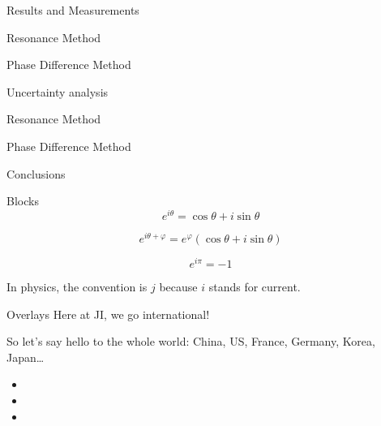 \documentclass{beamer}
\begin{document}
\begin{frame}{Results and Measurements}
\end{frame}
\begin{frame}{Resonance Method}
\end{frame}
\begin{frame}{Phase Difference Method}
\end{frame}

\begin{frame}{Uncertainty analysis}
\end{frame}
\begin{frame}{Resonance Method}
\end{frame}
\begin{frame}{Phase Difference Method}
\end{frame}

\begin{frame}{Conclusions}
\end{frame}

\begin{frame}{Blocks}
    \[
        e^{i \theta} = \cos \theta + i \sin \theta
    \]

    \[
        e^{i \theta + \varphi} = e^\varphi (\cos \theta + i \sin \theta)
    \]

    \[
        e^{i \pi} = -1
    \]

    In physics, the convention is $j$ because $i$ stands for current.
\end{frame}

\begin{frame}{Overlays}
Here at JI, we go international!

So let's say hello to the whole world: China, US, France, Germany,
Korea, Japan…

\begin{itemize}
    \item {}
    \item {}
    \item {}
\end{itemize}
\end{frame}
\end{document}
